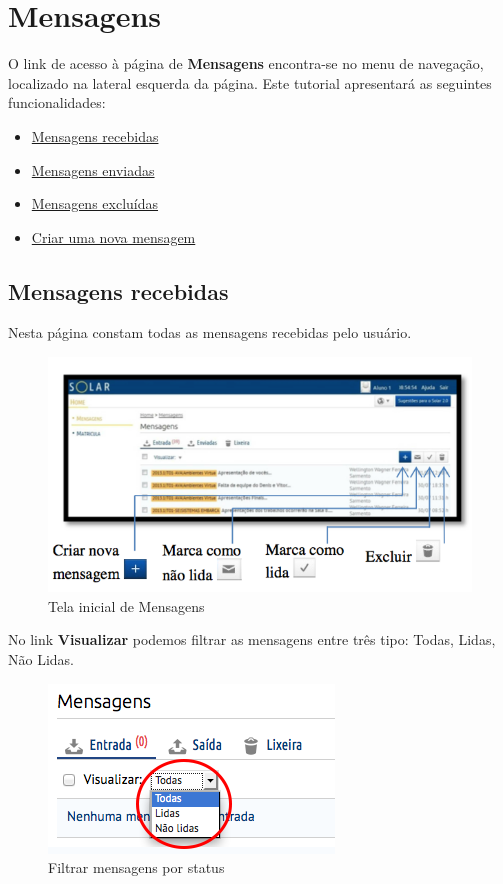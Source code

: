 \documentclass[letterpaper,10pt,english]{sphinxmanual}
\begin{document}
\section{Mensagens}
\label{messages:mensagens}\label{messages:message}\label{messages::doc}
O link de acesso à página de \textbf{Mensagens} encontra-se no menu de navegação, localizado na lateral esquerda da página. Este tutorial apresentará as seguintes funcionalidades:
\begin{itemize}
\item {} 
{\hyperref[messages:mensagens-recebidas]{Mensagens recebidas}}

\item {} 
{\hyperref[messages:mensagens-enviadas]{Mensagens enviadas}}

\item {} 
{\hyperref[messages:mensagens-excluidas]{Mensagens excluídas}}

\item {} 
{\hyperref[messages:criar-uma-nova-mensagem]{Criar uma nova mensagem}}

\end{itemize}


\subsection{Mensagens recebidas}
\label{messages:mensagens-recebidas}
Nesta página constam todas as mensagens recebidas pelo usuário.
\begin{figure}[htbp]
\centering
\capstart

\includegraphics{messages-inbox.png}
\caption{Tela inicial de Mensagens}\end{figure}

No link \textbf{Visualizar} podemos filtrar as mensagens entre três tipo: Todas, Lidas, Não Lidas.
\begin{figure}[htbp]
\centering
\capstart

\includegraphics{messages-filter.png}
\caption{Filtrar mensagens por status}\end{figure}
\end{document}
